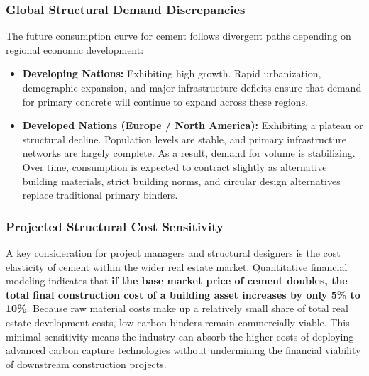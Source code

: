 \subsubsection{Global Structural Demand Discrepancies}
The future consumption curve for cement follows divergent paths depending on regional economic development:
\begin{itemize}
    \item \textbf{Developing Nations:} Exhibiting high growth. Rapid urbanization, demographic expansion, and major infrastructure deficits ensure that demand for primary concrete will continue to expand across these regions.
    \item \textbf{Developed Nations (Europe / North America):} Exhibiting a plateau or structural decline. Population levels are stable, and primary infrastructure networks are largely complete. As a result, demand for volume is stabilizing. Over time, consumption is expected to contract slightly as alternative building materials, strict building norms, and circular design alternatives replace traditional primary binders.
\end{itemize}

\subsubsection{Projected Structural Cost Sensitivity}
A key consideration for project managers and structural designers is the cost elasticity of cement within the wider real estate market. Quantitative financial modeling indicates that \textbf{if the base market price of cement doubles, the total final construction cost of a building asset increases by only \num{5}\% to \num{10}\%}. Because raw material costs make up a relatively small share of total real estate development costs, low-carbon binders remain commercially viable. This minimal sensitivity means the industry can absorb the higher costs of deploying advanced carbon capture technologies without undermining the financial viability of downstream construction projects.
